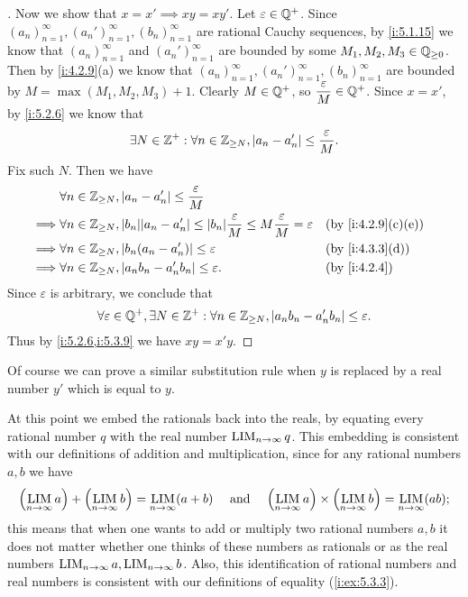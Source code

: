 \begin{proof}[]
  Now we show that \(x = x' \implies xy = xy'\).
  Let \(\varepsilon \in \mathbb{Q}^+\).
  Since \((a_n)_{n = 1}^\infty, (a_n')_{n = 1}^\infty, (b_n)_{n = 1}^\infty\) are rational Cauchy sequences, by \cref{i:5.1.15} we know that \((a_n)_{n = 1}^\infty\) and \((a_n')_{n = 1}^\infty\) are bounded by some \(M_1, M_2, M_3 \in \mathbb{Q}_{\geq 0}\).
  Then by \cref{i:4.2.9}(a) we know that \((a_n)_{n = 1}^\infty, (a_n')_{n = 1}^\infty, (b_n)_{n = 1}^\infty\) are bounded by \(M = \max(M_1, M_2, M_3) + 1\).
  Clearly \(M \in \mathbb{Q}^+\), so \(\dfrac{\varepsilon}{M} \in \mathbb{Q}^+\).
  Since \(x = x'\), by \cref{i:5.2.6} we know that
  \[
    \exists N \in \mathbb{Z}^+ : \forall n \in \mathbb{Z}_{\geq N}, \left\lvert a_n - a_n'\right\rvert \leq \dfrac{\varepsilon}{M}.
  \]
  Fix such \(N\).
  Then we have
  \begin{align*}
             & \forall n \in \Z_{\geq N}, \abs{a_n - a_n'} \leq \dfrac{\varepsilon}{M}                                                                                        \\
    \implies & \forall n \in \Z_{\geq N}, \abs{b_n} \abs{a_n - a_n'} \leq \abs{b_n} \dfrac{\varepsilon}{M} \leq M \dfrac{\varepsilon}{M} = \varepsilon &  & \by{i:4.2.9}[c,e] \\
    \implies & \forall n \in \Z_{\geq N}, \abs{b_n (a_n - a_n')} \leq \varepsilon                                                                      &  & \by{i:4.3.3}[d]   \\
    \implies & \forall n \in \Z_{\geq N}, \abs{a_n b_n - a_n' b_n} \leq \varepsilon.                                                                   &  & \by{i:4.2.4}
  \end{align*}
  Since \(\varepsilon\) is arbitrary, we conclude that
  \[
    \forall \varepsilon \in \mathbb{Q}^+, \exists N \in \mathbb{Z}^+ : \forall n \in \mathbb{Z}_{\geq N}, \left\lvert a_n b_n - a_n' b_n\right\rvert \leq \varepsilon.
  \]
  Thus by \cref{i:5.2.6,i:5.3.9} we have \(xy = x'y\).
\end{proof}

\begin{note}
  Of course we can prove a similar substitution rule when \(y\) is replaced by a real number \(y'\) which is equal to \(y\).
\end{note}

\begin{ac}\label{i:ac:5.3.1}
  At this point we embed the rationals back into the reals, by equating every rational number \(q\) with the real number \(\operatorname*{LIM}_{n \to \infty} q\).
  This embedding is consistent with our definitions of addition and multiplication, since for any rational numbers \(a, b\) we have
  \[
    \pa{\LIM_{n \to \infty} a} + \pa{\LIM_{n \to \infty} b} = \LIM_{n \to \infty} (a + b) \quad \text{ and } \quad \pa{\LIM_{n \to \infty} a} \times \pa{\LIM_{n \to \infty} b} = \LIM_{n \to \infty} (ab);
  \]
  this means that when one wants to add or multiply two rational numbers \(a, b\) it does not matter whether one thinks of these numbers as rationals or as the real numbers \(\operatorname*{LIM}_{n \to \infty} a, \operatorname*{LIM}_{n \to \infty} b\).
  Also, this identification of rational numbers and real numbers is consistent with our definitions of equality (\cref{i:ex:5.3.3}).
\end{ac}


